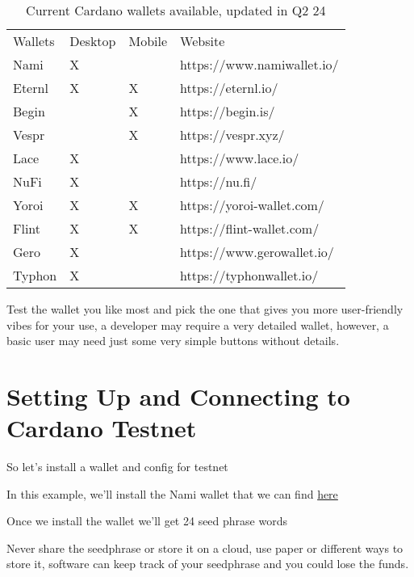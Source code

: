 \begin{table}[h!]
    \caption{Current Cardano wallets available, updated in Q2 24}
    \begin{tabular}{llll}
    Wallets & Desktop & Mobile & Website                    \\
    Nami    & X       &        & https://www.namiwallet.io/ \\
    Eternl  & X       & X      & https://eternl.io/         \\
    Begin   &         & X      & https://begin.is/          \\
    Vespr   &         & X      & https://vespr.xyz/         \\
    Lace    & X       &        & https://www.lace.io/       \\
    NuFi    & X       &        & https://nu.fi/             \\
    Yoroi   & X       & X      & https://yoroi-wallet.com/  \\
    Flint   & X       & X      & https://flint-wallet.com/  \\
    Gero    & X       &        & https://www.gerowallet.io/ \\
    Typhon  & X       &        & https://typhonwallet.io/   \\
    \end{tabular}
\end{table}

Test the wallet you like most and pick the one that gives you more user-friendly vibes for your use, a developer may require a very detailed wallet, however, a basic user may need just some very simple buttons without details.

\section{Setting Up and Connecting to Cardano Testnet}
So let's install a wallet and config for testnet 

In this example, we'll install the Nami wallet that we can find \href{https://www.namiwallet.io/}{here}

Once we install the wallet we'll get 24 seed phrase words

\begin{remark}
Never share the seedphrase or store it on a cloud, use paper or different ways to store it, software can keep track of your seedphrase and you could lose the funds.
\end{remark}

